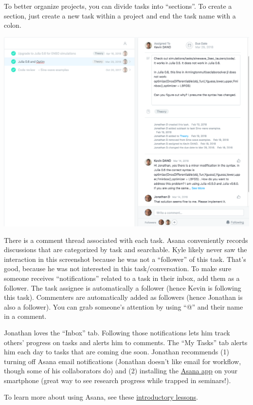 To better organize projects, you can divide tasks into ``sections''.
To create a section, just create a new task within a project and end the task name with a colon.


\begin{center}
\includegraphics[width=.8\textwidth]{./figures/workflow/asana_screenshot2.png}
\end{center}

There is a comment thread associated with each task.
Asana conveniently records discussions that are categorized by task and searchable.
Kyle likely never saw the interaction in this screenshot because he was not a ``follower'' of this task.
That's good, because he was not interested in this task/conversation.
To make sure someone receives ``notifications'' related to a task in their inbox, add them as a follower.
The task assignee is automatically a follower (hence Kevin is following this task).
Commenters are automatically added as followers (hence Jonathan is also a follower).
You can grab someone's attention by using ``@'' and their name in a comment.


Jonathan loves the ``Inbox'' tab.
Following those notifications lets him track others' progress on tasks and alerts him to comments.
The ``My Tasks'' tab alerts him each day to tasks that are coming due soon.
Jonathan recommends 
(1) turning off Asana email notifications (Jonathan doesn't like email for workflow, though some of his collaborators do)
and 
(2) installing the \href{https://asana.com/apps/asana}{Asana app} on your smartphone (great way to see research progress while trapped in seminars!).



To learn more about using Asana, see these \href{https://asana.com/guide/resources/get-started/quick-start#lessons?lesson=tasks-1}{introductory lessons}.